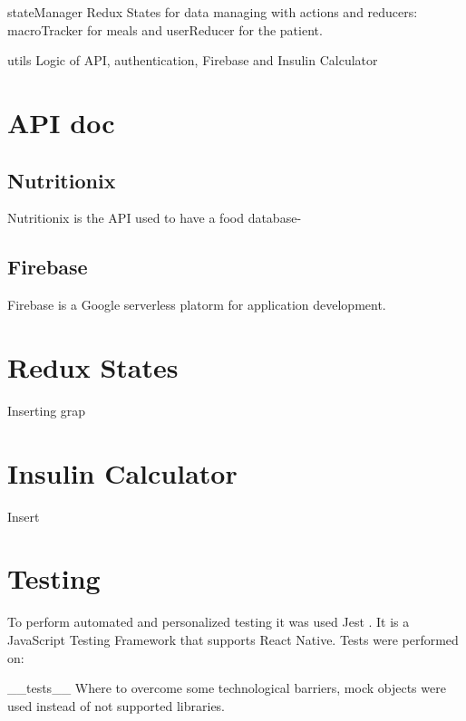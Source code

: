 \documentclass[12pt,hidelinks]{article}
\begin{document}
	\begin{docCommand}{stateManager}{}
		Redux States for data managing with actions and reducers: macroTracker for meals and userReducer for the patient.
	\end{docCommand}

	\begin{docCommand}{utils}{}
		Logic of API, authentication, Firebase and Insulin Calculator
	\end{docCommand}




\newpage
\section{API doc}	
\vspace{10.5cm}	
	\subsection{Nutritionix}\label{subsec:mathenvironments}
		Nutritionix \cite{Nutritionix} is the API used to have a food database-
	\subsection{Firebase}
	    Firebase \cite{Firebase} is a Google serverless platorm for application development. 
		
\newpage
\section{Redux States}
\vspace{10.5cm}
	Inserting grap
\section{Insulin Calculator}
\vspace{10.5cm}
	Insert
\newpage
{}
\section{Testing}
\vspace{10.5cm}

To perform automated and personalized testing it was used Jest \cite{Jest}. It is a JavaScript Testing Framework that supports React Native.
Tests were performed on:
\begin{docCommand}{__tests__}{}
Where to overcome some technological barriers, mock objects were used instead of not supported libraries.
\end{docCommand}
\end{document}
